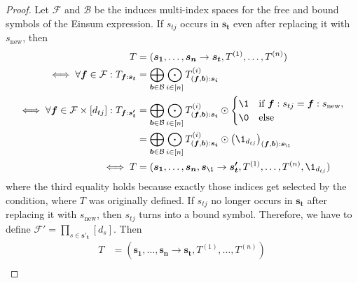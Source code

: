 \begin{proof}
    \small
    Let $\mathcal{F}$ and $\mathcal{B}$ be the induces multi-index spaces for the free and bound symbols of the Einsum expression.
    If $s_{tj}$ occurs in $\bm{s_t}$ even after replacing it with $s_{\text{new}}$, then
    \begin{align*}
        T                                                                         & = (\bm{s_1}, \dots, \bm{s_n} \rightarrow \bm{s_t}, T^{(1)}, \dots, T^{(n)})                                                                                             \\
        \iff \forall \bm{f} \in \mathcal{F}: T_{\bm{f}:\bm{s_t}}                  & = \bigoplus\limits_{\bm{b} \in \mathcal{B}} \bigodot\limits_{i \in [n]} T^{(i)}_{(\bm{f}, \bm{b}):\bm{s_i}}                                                             \\
        \iff \forall \bm{f} \in \mathcal{F} \times [d_{tj}]: T_{\bm{f}:\bm{s'_t}} & = \bigoplus\limits_{\bm{b} \in \mathcal{B}} \bigodot\limits_{i \in [n]} T^{(i)}_{(\bm{f}, \bm{b}):\bm{s_i}} \odot \begin{cases}
            \1 & \text{if $\bm{f}: s_{tj} = \bm{f}: s_{\text{new}}$}, \\
            \0 & \text{else}
        \end{cases}                             \\
                                                                                  & = \bigoplus\limits_{\bm{b} \in \mathcal{B}} \bigodot\limits_{i \in [n]} T^{(i)}_{(\bm{f}, \bm{b}):\bm{s_i}} \odot \left(\1_{d_{tj}}\right)_{(\bm{f}, \bm{b}):\bm{s_\1}} \\
        \iff T                                                                    & = (\bm{s_1}, \dots, \bm{s_n}, \bm{s_\1} \rightarrow \bm{s'_t}, T^{(1)}, \dots, T^{(n)}, \1_{d_{tj}})
    \end{align*}
    where the third equality holds because exactly those indices get selected by the condition, where $T$ was originally defined.
    If $s_{tj}$ no longer occurs in $\bm{s_t}$ after replacing it with $s_{\text{new}}$, then $s_{tj}$ turns into a bound symbol.
    Therefore, we have to define $\mathcal{F}' = \prod_{s \in \bm{s'_t}} [d_s]$.
    Then
    \begin{align*}
        T                                                          & = (\bm{s_1}, \dots, \bm{s_n} \rightarrow \bm{s_t}, T^{(1)}, \dots, T^{(n)})                                                                                                             \\

\end{align*}
\end{proof}
